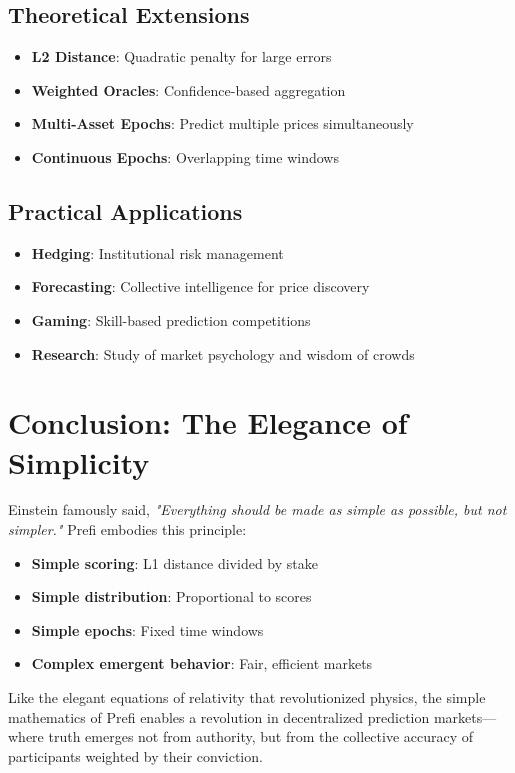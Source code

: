 \documentclass[12pt,a4paper]{article}
\begin{document}
\subsection{Theoretical Extensions}
\begin{itemize}
\item \textbf{L2 Distance}: Quadratic penalty for large errors
\item \textbf{Weighted Oracles}: Confidence-based aggregation
\item \textbf{Multi-Asset Epochs}: Predict multiple prices simultaneously
\item \textbf{Continuous Epochs}: Overlapping time windows
\end{itemize}

\subsection{Practical Applications}
\begin{itemize}
\item \textbf{Hedging}: Institutional risk management
\item \textbf{Forecasting}: Collective intelligence for price discovery
\item \textbf{Gaming}: Skill-based prediction competitions
\item \textbf{Research}: Study of market psychology and wisdom of crowds
\end{itemize}

\section{Conclusion: The Elegance of Simplicity}

Einstein famously said, \textit{"Everything should be made as simple as possible, but not simpler."} Prefi embodies this principle:

\begin{itemize}
\item \textbf{Simple scoring}: L1 distance divided by stake
\item \textbf{Simple distribution}: Proportional to scores
\item \textbf{Simple epochs}: Fixed time windows
\item \textbf{Complex emergent behavior}: Fair, efficient markets
\end{itemize}

Like the elegant equations of relativity that revolutionized physics, the simple mathematics of Prefi enables a revolution in decentralized prediction markets—where truth emerges not from authority, but from the collective accuracy of participants weighted by their conviction.
\end{document}
